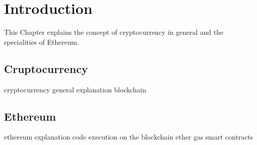 \chapter{Introduction}\label{chap:intro}
\chapterstart

This Chapter explains the concept of cryptocurrency in general and the specialities of Ethereum.


\section{Cruptocurrency}\label{sec:crypto}

cryptocurrency general explanation
blockchain

\section{Ethereum}\label{sec:ethereum}

ethereum explanation
code execution on the blockchain
ether
gas
smart contracts


\chapterend

